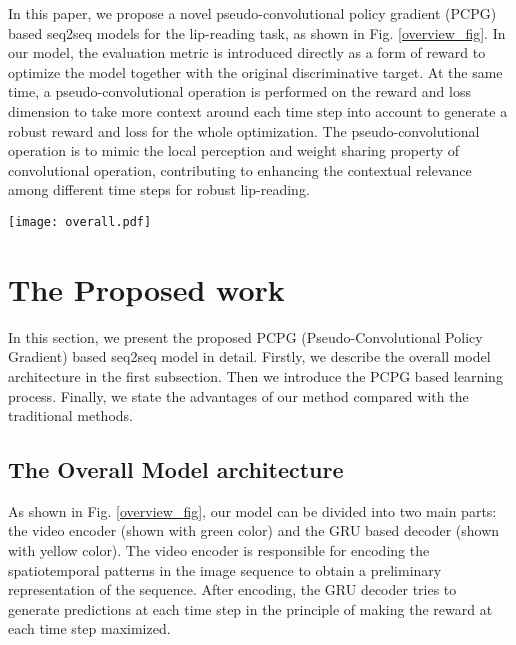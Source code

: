 \documentclass[a4paper, 10pt, conference]{ieeeconf}      \usepackage{FG2020}
\begin{document}
In this paper, we propose a novel pseudo-convolutional policy gradient (PCPG) based seq2seq models for the lip-reading task, as shown in Fig. \ref{overview_fig}. 
In our model, the evaluation metric is introduced directly as a form of reward to optimize the model together with the original discriminative target.
At the same time, a pseudo-convolutional operation is performed on the reward and loss dimension to take more context around each time step into account to generate a robust reward and loss for the whole optimization. The pseudo-convolutional operation is to mimic the local perception and weight sharing property of convolutional operation, contributing to enhancing the contextual relevance among different time steps for robust lip-reading.

\begin{figure*}[htb]
	\setlength{\abovecaptionskip}{0.2cm}
	\setlength{\belowcaptionskip}{-0.3cm} 
	\centering
	\texttt{[image: overall.pdf]}
	\caption{Overview of our proposed PCPG based seq2seq model for lip-reading. In this model, the GRU decoder is regarded as an agent and the ground truth is regarded as the environment. In the learning process, the agent observes the old state generated from the previous time steps and then takes an action to output a new character/word to obtain a new state. The new state, old state, and the environment would contribute to the reward together for the action. Finally, the reward is fed to the PCPG module to generate the final loss when passed to the agent.}\label{overview_fig}
\end{figure*}
\section{The Proposed work}
\label{sec:Pro}
In this section, we present the proposed PCPG (Pseudo-Convolutional Policy Gradient) based seq2seq model in detail. Firstly, we describe the overall model architecture in the first subsection. Then we introduce the PCPG based learning process. Finally, we state the advantages of our method compared with the traditional methods.

\subsection{The Overall Model architecture} \label{section3.1}
As shown in Fig. \ref{overview_fig}, our model can be divided into two main parts: the video encoder (shown with green color) and the GRU based decoder (shown with yellow color). The video encoder is responsible for encoding the spatiotemporal patterns in the image sequence to obtain a preliminary representation of the sequence. After encoding, the GRU decoder tries to generate predictions at each time step in the principle of making the reward at each time step maximized.
\end{document}
